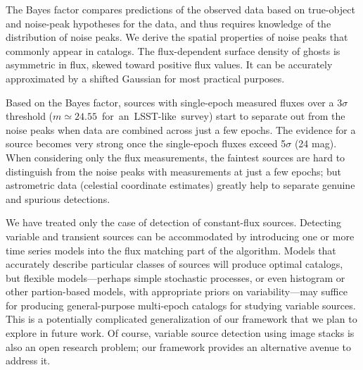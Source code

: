\documentclass[twocolumn]{emulateapj}
\newcommand\enote[1]{ {\color{red}%
\marginpar[\raggedleft\large $\blacktriangleright$]%
{\raggedright\large $\blacktriangleleft$} %
{\large $\langle\langle\langle$}{\sl #1}{\large  $\rangle\rangle\rangle$} }}
\begin{document}
The Bayes factor compares predictions of the observed data based on true-object and noise-peak hypotheses for the data, and thus requires knowledge of the distribution of noise peaks.
We derive the spatial properties of noise peaks that commonly appear in catalogs.
The flux-dependent surface density of ghosts is asymmetric in flux, skewed toward positive flux values.
It can be accurately approximated by a shifted Gaussian for most practical purposes.

Based on the Bayes factor, sources with single-epoch measured fluxes over a \mbox{3$\sigma$} threshold \mbox{($m\!\simeq\!24.55$ for an LSST-like survey)} start to separate out from the noise peaks when data are combined across just a few epochs.
The evidence for a source becomes very strong once the single-epoch fluxes exceed \mbox{5$\sigma$} (24 mag).
%
When considering only the flux measurements, the faintest sources are hard to distinguish from the noise peaks with measurements at just a few epochs; but astrometric data (celestial coordinate estimates) greatly help to separate genuine and spurious detections.

\iffalse
In general, the specificity and the selectivity of the proposed discriminator depends on a number of parameters, most of which we discuss as part of the simulated case study.
The pixel size, the single-epoch detection threshold, the number of exposures, and the point-spread function all affect the frequency of noise peaks.
The population distribution of source properties also directly impacts detectability of faint sources.
A hierarchical generalization of the approach could learn important features of the population distribution as part of the analysis. 
\enote{Not clear what this is getting at, in the previous revision:  ``as well as the statistics of the real sources based on which one can come up with reliable thresholds for progressively weeding out noise from the catalogs throughout the lifetime of a survey.''}
\fi



We have treated only the case of detection of constant-flux sources.
Detecting variable and transient sources can be accommodated by introducing one or more time series models into the flux matching part of the algorithm.
Models that accurately describe particular classes of sources will produce optimal catalogs, but flexible models---perhaps simple stochastic processes, or even histogram or other partion-based models, with appropriate priors on variability---may suffice for producing general-purpose multi-epoch catalogs for studying variable sources.
This is a potentially complicated generalization of our framework that we plan to explore in future work.
Of course, variable source detection using image stacks is also an open research problem; our framework provides an alternative avenue to address it.
\end{document}
